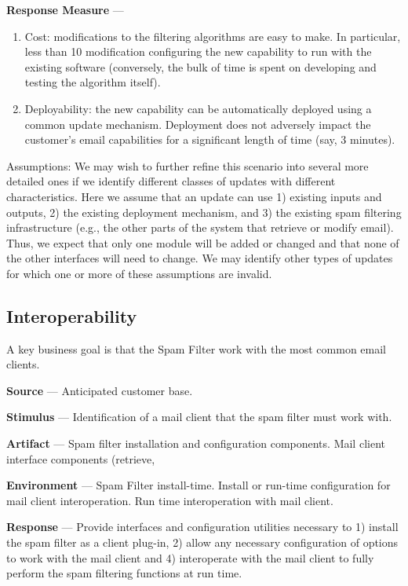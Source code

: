 \documentclass[11pt,letterpaper]{article}
\begin{document}
\textbf{Response Measure} ---
\begin{enumerate}
\item Cost: modifications to the filtering algorithms are easy to make.  In
  particular, less than 10%
  modification configuring the new capability to run with the existing
  software (conversely, the bulk of time is spent on developing and testing
  the algorithm itself).
\item Deployability: the new capability can be automatically deployed using a
  common update mechanism. Deployment does not adversely impact the customer’s
  email capabilities for a significant length of time (say, 3 minutes).
\end{enumerate}
 
Assumptions: We may wish to further refine this scenario into several more
detailed ones if we identify different classes of updates with different
characteristics. Here we assume that an update can use 1) existing inputs and
outputs, 2) the existing deployment mechanism, and 3) the existing spam
filtering infrastructure (e.g., the other parts of the system that retrieve or
modify email). Thus, we expect that only one module will be added or changed
and that none of the other interfaces will need to change. We may identify
other types of updates for which one or more of these assumptions are invalid.

\subsection{Interoperability}
A key business goal is that the Spam Filter work with the most common email
clients.
 
\textbf{Source} --- Anticipated customer base. 

\textbf{Stimulus} --- Identification of a mail client that the spam filter must work with. 

\textbf{Artifact} --- Spam filter installation and configuration
components. Mail client interface components (retrieve,

\textbf{Environment} --- Spam Filter install-time. Install or run-time
configuration for mail client interoperation. Run time interoperation with
mail client.

\textbf{Response} --- Provide interfaces and configuration utilities necessary
to 1) install the spam filter as a client plug-in, 2) allow any necessary
configuration of options to work with the mail client and 4) interoperate with
the mail client to fully perform the spam filtering functions at run time.
\end{document}
